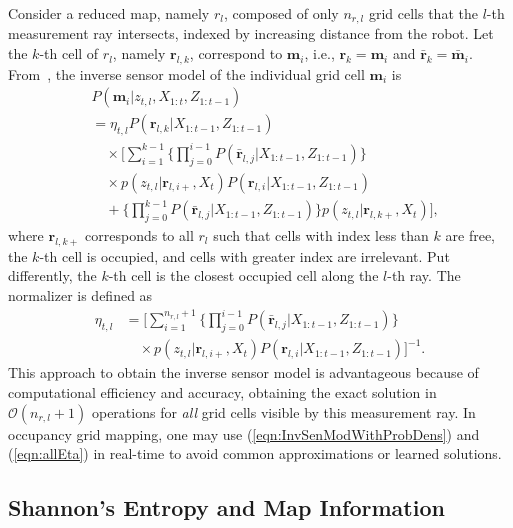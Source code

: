 \documentclass[letterpaper, 10pt]{ieeeconf}
\newcommand{\refeqn}[1]{(\ref{eqn:#1})}
\begin{document}
Consider a reduced map, namely $r_l$, composed of only $n_{r,l}$ grid cells that the $l$-th measurement ray intersects, indexed by increasing distance from the robot. Let the $k$-th cell of $r_l$, namely $\mathbf{r}_{l,k}$, correspond to $\mathbf{m}_i$, i.e., $\mathbf{r}_k=\mathbf{m}_i$ and $\bar{\mathbf{r}}_k=\bar{\mathbf{m}}_i$.
From~\cite{KauLeeAiMos16}, the inverse sensor model of the individual grid cell $\mathbf{m}_i$ is
\begin{align}
\label{eqn:InvSenModWithProbDens}
&P(\mathbf{m}_i|z_{t,l},X_{1:t},Z_{1:t-1})\nonumber
\\
&=\eta_{t,l}
P(\mathbf{r}_{l,k}|X_{1:t-1},Z_{1:t-1})\nonumber\\
&\quad\times \bigg[\sum_{i=1}^{k-1}\bigg\{\prod_{j=0}^{i-1}P(\bar{\mathbf{r}}_{l,j}|X_{1:t-1},Z_{1:t-1})\bigg\}\nonumber\\
&\quad\times p(z_{t,l}|\mathbf{r}_{l,i+},X_t)P(\mathbf{r}_{l,i}|X_{1:t-1},Z_{1:t-1})\nonumber\\
&\quad + \bigg\{\prod_{j=0}^{k-1}P(\bar{\mathbf{r}}_{l,j}|X_{1:t-1},Z_{1:t-1})\bigg\}p(z_{t,l}|\mathbf{r}_{l,k+},X_t)
\bigg],
\end{align}
where $\mathbf{r}_{l,k+}$ corresponds to all $r_l$ such that cells with index less than $k$ are free, the $k$-th cell is occupied, and cells with greater index are irrelevant. Put differently, the $k$-th cell is the closest occupied cell along the $l$-th ray. The normalizer is defined as
\begin{align}
\label{eqn:allEta}
\eta_{t,l}
&=
\bigg[\sum_{i=1}^{n_{r,l}+1}\bigg\{\prod_{j=0}^{i-1}P(\bar{\mathbf{r}}_{l,j}|X_{1:t-1},Z_{1:t-1})\bigg\}\nonumber\\&\quad\times p(z_{t,l}|\mathbf{r}_{l,i+},X_t)P(\mathbf{r}_{l,i}|X_{1:t-1},Z_{1:t-1})\bigg]^{-1}.
\end{align}
This approach to obtain the inverse sensor model is advantageous because of computational efficiency and accuracy, obtaining the exact solution in $\mathcal O(n_{r,l}+1)$ operations for \emph{all} grid cells visible by this measurement ray. In occupancy grid mapping, one may use \refeqn{InvSenModWithProbDens} and \refeqn{allEta} in real-time to avoid common approximations or learned solutions.

\subsection{Shannon's Entropy and Map Information}
\end{document}
